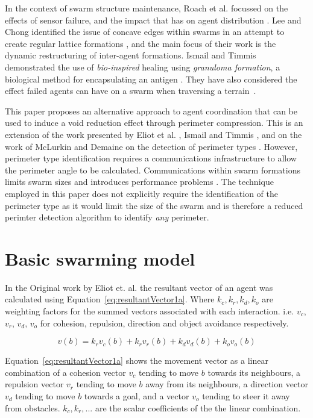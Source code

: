 \documentclass[12pt,a4paper]{IEEEtran}
\newcommand{\kc}{\mathit{k_c}}
\newcommand{\kr}{\mathit{k_r}}
\newcommand{\kd}{\mathit{k_d}}
\newcommand{\ko}{\mathit{k_o}}
\begin{document}
In the context of swarm structure maintenance, Roach et al. focussed on the effects of sensor failure, and the impact that has on agent distribution \cite{RMT:15}. Lee and Chong identified the issue of concave edges within swarms in an attempt to create regular lattice formations \cite{GN:08}, and the main focus of their work is the dynamic restructuring of inter-agent formations. Ismail and Timmis demonstrated the use of \textit{bio-inspired} healing using \textit{granuloma formation}, a biological method for encapsulating an antigen \cite{IT:10}. They have also considered the effect failed agents can have on a swarm when traversing a terrain~\cite{TIBW:16}. 

This paper proposes an alternative approach to agent coordination that can be used to induce a void reduction effect through perimeter compression. This is an extension of the work presented by Eliot et al. \cite{eliot2019void}, Ismail and Timmis \cite{IT:10,TIBW:16}, and on the work of McLurkin and Demaine on the detection of perimeter types \cite{mclurkin2009}. However, perimeter type identification requires a communications infrastructure to allow the perimeter angle to be calculated. Communications within swarm formations limits swarm sizes and introduces performance problems \cite{fu2020formation}. The technique employed in this paper does not explicitly require the identification of the perimeter type as it would limit the size of the swarm\cite{eliot2019void,GN:08} and is therefore a reduced perimter detection algorithm to identify \textit{any} perimeter.

\section{Basic swarming model}\label{sec:basicModel}
In the Original work by Eliot et. al. the resultant vector of an agent was calculated using Equation~\ref{eq:resultantVector1a}. Where $\kc, \kr, k_d, k_o$ are weighting factors for the summed vectors associated with each interaction. i.e. $v_c$, $v_r$, $v_d$, $v_o$ for cohesion, repulsion, direction and object avoidance respectively. 

\begin{equation}\label{eq:resultantVector1a}
	v(b) = \kr v_c(b) + \kr v_r(b) + \kd v_d(b) + \ko v_o(b)
\end{equation}

Equation~\ref{eq:resultantVector1a} shows the movement vector as a linear combination of a cohesion vector $v_c$ tending to move $b$ towards its neighbours, a repulsion vector $v_r$ tending to move $b$ away from its neighbours, a direction vector  $v_d$ tending to move $b$ towards a goal, and a vector $v_o$ tending to steer it away from obstacles. $\kc, \kr, ...$ are the scalar coefficients of the the linear combination.
\end{document}
